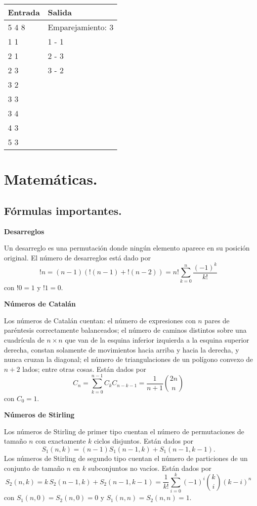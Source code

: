 \documentclass[10pt, letterpaper, twoside]{article}
\begin{document}
\begin{tabular}{|p{7cm}|p{7cm}|}
\hline
\textbf{Entrada} & \textbf{Salida} \\ \hline
5 4 8 & Emparejamiento: 3 \\
1 1   & 1 - 1 \\
2 1   & 2 - 3 \\
2 3   & 3 - 2 \\
3 2   & \\
3 3   & \\
3 4   & \\
4 3   & \\
5 3   & \\ \hline
\end{tabular}


\section{Matemáticas.}

\subsection{Fórmulas importantes.}

\textbf{Desarreglos}

Un desarreglo es una permutación donde ningún elemento aparece en su posición original. El número de desarreglos está dado por
$$!n = (n - 1)(!(n - 1) + !(n - 2)) = n! \sum_{k=0}^n \frac{(-1)^k}{k!}$$
con $!0 = 1$ y $!1 = 0$.\medskip

\textbf{Números de Catalán}

Los números de Catalán cuentan: el número de expresiones con $n$ pares de paréntesis correctamente balanceados; el número de caminos distintos sobre una cuadrícula de $n \times n$ que van de la esquina inferior izquierda a la esquina superior derecha, constan solamente de movimientos hacia arriba y hacia la derecha, y nunca cruzan la diagonal; el número de triangulaciones de un polígono convexo de $n + 2$ lados; entre otras cosas. Están dados por
$$C_n = \sum_{k=0}^{n-1} C_kC_{n-k-1} = \frac{1}{n + 1}\binom{2n}{n}$$
con $C_0 = 1$.\medskip

\textbf{Números de Stirling}

Los números de Stirling de primer tipo cuentan el número de permutaciones de tamaño $n$ con exactamente $k$ ciclos disjuntos. Están dados por 
$$S_1(n, k) = (n - 1)S_1(n - 1, k) + S_1(n - 1, k - 1).$$
Los números de Stirling de segundo tipo cuentan el número de particiones de un conjunto de tamaño $n$ en $k$ subconjuntos no vacíos. Están dados por 
$$S_2(n, k) = k \,S_2(n - 1, k) + S_2(n - 1, k - 1) = \frac{1}{k!} \sum_{i=0}^k (-1)^i \binom{k}{i}(k - i)^n$$
con $S_1(n, 0) = S_2(n, 0) =  0$ y $S_1(n, n) = S_2(n, n) = 1$.\medskip
\end{document}
